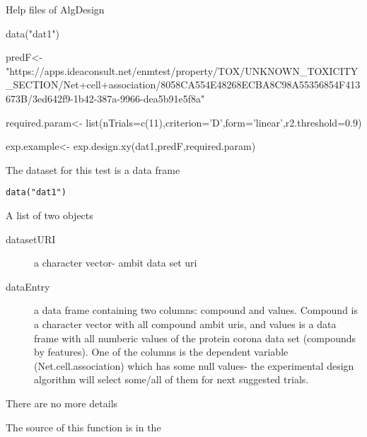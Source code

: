 \documentclass[letterpaper]{book}
\begin{document}
%
\begin{References}\relax
Help files of AlgDesign
\end{References}
%
\begin{Examples}
\begin{ExampleCode}

data("dat1")

predF<- "https://apps.ideaconsult.net/enmtest/property/TOX/UNKNOWN_TOXICITY_SECTION/Net+cell+association/8058CA554E48268ECBA8C98A55356854F413673B/3ed642f9-1b42-387a-9966-dea5b91e5f8a"

required.param<- list(nTrials=c(11),criterion='D',form='linear',r2.threshold=0.9)

exp.example<- exp.design.xy(dat1,predF,required.param) 

\end{ExampleCode}
\end{Examples}
%
\begin{Description}\relax
The dataset for this test is a data frame
\end{Description}
%
\begin{Usage}
\begin{verbatim}
data("dat1")
\end{verbatim}
\end{Usage}
%
\begin{Format}
A list of two objects
\begin{description}

\item[datasetURI] a character vector- ambit data set uri
\item[dataEntry] a data frame containing two columns: compound and values. Compound is a character vector with all compound ambit uris, and values is a data frame with all numberic values of the protein corona data set (compounds by features). One of the columns is the dependent variable (Net.cell.association) which has some null values- the experimental design algorithm will select some/all of them for next suggested trials.

\end{description}

\end{Format}
%
\begin{Details}\relax
There are no more details
\end{Details}
%
\begin{Source}\relax
The source of this function is in the
\end{Source}
\end{document}
